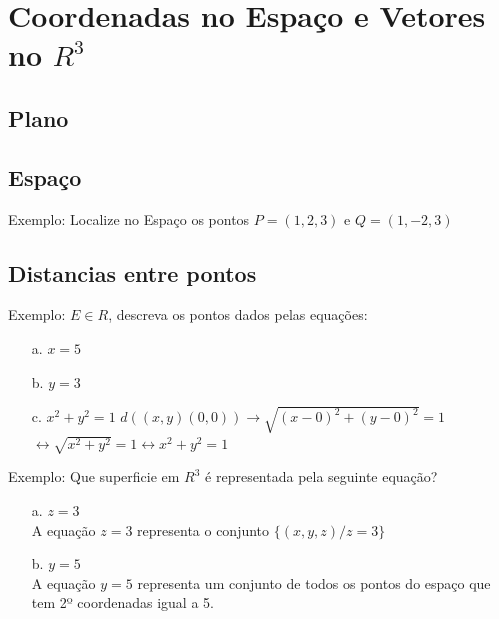 \date{01-10-2024}
\section{Coordenadas no Espaço e Vetores no $R^3$} %
\subsection{Plano}
\begin{centering}

\end{centering}

\subsection{Espaço}



Exemplo:
Localize no Espaço os pontos $P=(1,2,3)$ e $Q=(1,-2,3)$



\subsection{Distancias entre pontos}

Exemplo:
$E \in R$, descreva os pontos dados pelas equações:
\begin{itemize}
     

\item[a.] $x=5$
\item[b.] $y =3$
\item[c.] $x^2 + y^2 = 1$
    $d((x,y)(0,0)) \rightarrow \sqrt{(x-0)^2 + (y-0)^2} = 1$ \\
    $\leftrightarrow \sqrt{x^2 + y^2} = 1 \leftrightarrow x^2 + y^2 = 1$ 

\end{itemize}

Exemplo: Que superficie em $R^3$ é representada pela seguinte equação?
\begin{itemize}
    \item[a.] $z=3$  \\ A equação $z=3$ representa o conjunto $\{(x,y,z) / z=3 \}$
    \item[b.] $y = 5$ \\ A equação $y=5$ representa um conjunto de todos os pontos do espaço que tem 2º coordenadas igual a 5.  
\end{itemize}

